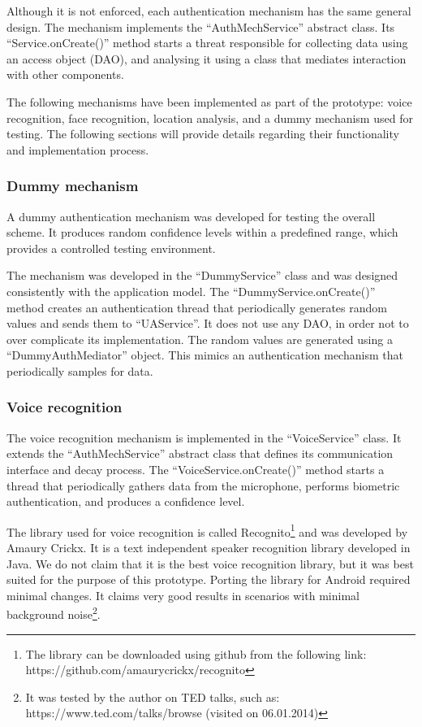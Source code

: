 Although it is not enforced, each authentication mechanism has the same general design. The mechanism implements the ``AuthMechService'' abstract class. Its ``Service.onCreate()'' method starts a threat responsible for collecting data using an access object (DAO), and analysing it using a class that mediates interaction with other components. 

The following mechanisms have been implemented as part of the prototype: voice recognition, face recognition, location analysis, and a dummy mechanism used for testing. The following sections will provide details regarding their functionality and implementation process.

\subsubsection{Dummy mechanism}
A dummy authentication mechanism was developed for testing the overall scheme. It produces random confidence levels within a predefined range, which provides a controlled testing environment.

The mechanism was developed in the ``DummyService'' class and was designed consistently with the application model. The ``DummyService.onCreate()'' method creates an authentication thread that periodically generates random values and sends them to ``UAService''. It does not use any DAO, in order not to over complicate its implementation. The random values are generated using a ``DummyAuthMediator'' object. This mimics an authentication mechanism that periodically samples for data.  

\subsubsection{Voice recognition}
The voice recognition mechanism is implemented in the ``VoiceService'' class. It extends the ``AuthMechService'' abstract class that defines its communication interface and decay process. The ``VoiceService.onCreate()'' method starts a thread that periodically gathers data from the microphone, performs biometric authentication, and produces a confidence level.


The library used for voice recognition is called Recognito\footnote{The library can be downloaded using github from the following link: https://github.com/amaurycrickx/recognito} and was developed by Amaury Crickx. It is a text independent speaker recognition library developed in Java. We do not claim that it is the best voice recognition library, but it was best suited for the purpose of this prototype. Porting the library for Android required minimal changes. It claims very good results in scenarios with minimal background noise\footnote{It was tested by the author on TED talks, such as:  https://www.ted.com/talks/browse (visited on 06.01.2014)}.

